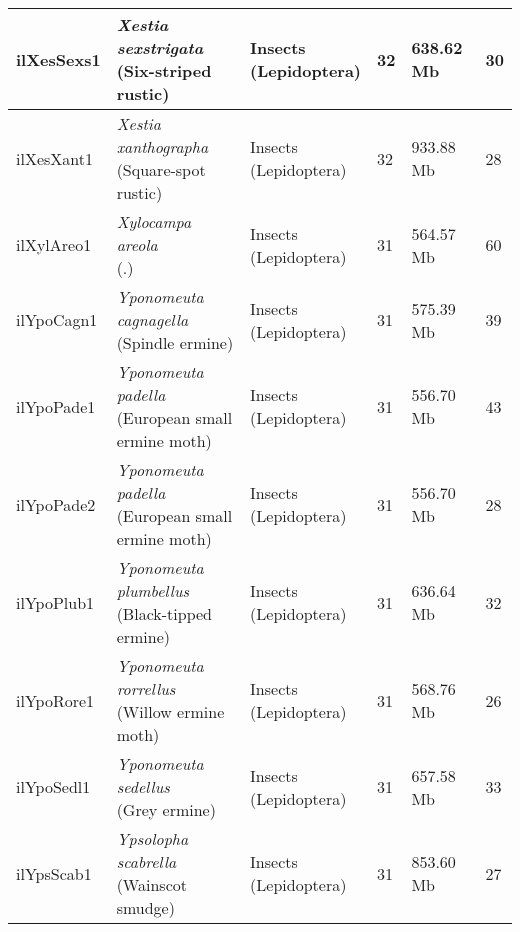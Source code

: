 \begin{centering}
\begin{longtable}{l|l|l|l|l|l}
ilXesSexs1 & \makecell[{l}]{\textit{Xestia sexstrigata} \\ (Six-striped rustic)} & \makecell[{l}]{Insects \\ (Lepidoptera)} & 32 & 638.62 Mb & 30  \\ \hline
ilXesXant1 & \makecell[{l}]{\textit{Xestia xanthographa} \\ (Square-spot rustic)} & \makecell[{l}]{Insects \\ (Lepidoptera)} & 32 & 933.88 Mb & 28  \\ \hline
ilXylAreo1 & \makecell[{l}]{\textit{Xylocampa areola} \\ (.)} & \makecell[{l}]{Insects \\ (Lepidoptera)} & 31 & 564.57 Mb & 60  \\ \hline
ilYpoCagn1 & \makecell[{l}]{\textit{Yponomeuta cagnagella} \\ (Spindle ermine)} & \makecell[{l}]{Insects \\ (Lepidoptera)} & 31 & 575.39 Mb & 39  \\ \hline
ilYpoPade1 & \makecell[{l}]{\textit{Yponomeuta padella} \\ (European small ermine moth)} & \makecell[{l}]{Insects \\ (Lepidoptera)} & 31 & 556.70 Mb & 43  \\ \hline
ilYpoPade2 & \makecell[{l}]{\textit{Yponomeuta padella} \\ (European small ermine moth)} & \makecell[{l}]{Insects \\ (Lepidoptera)} & 31 & 556.70 Mb & 28  \\ \hline
ilYpoPlub1 & \makecell[{l}]{\textit{Yponomeuta plumbellus} \\ (Black-tipped ermine)} & \makecell[{l}]{Insects \\ (Lepidoptera)} & 31 & 636.64 Mb & 32  \\ \hline
ilYpoRore1 & \makecell[{l}]{\textit{Yponomeuta rorrellus} \\ (Willow ermine moth)} & \makecell[{l}]{Insects \\ (Lepidoptera)} & 31 & 568.76 Mb & 26  \\ \hline
ilYpoSedl1 & \makecell[{l}]{\textit{Yponomeuta sedellus} \\ (Grey ermine)} & \makecell[{l}]{Insects \\ (Lepidoptera)} & 31 & 657.58 Mb & 33  \\ \hline
ilYpsScab1 & \makecell[{l}]{\textit{Ypsolopha scabrella} \\ (Wainscot smudge)} & \makecell[{l}]{Insects \\ (Lepidoptera)} & 31 & 853.60 Mb & 27  \\ \hline

\end{longtable}
\end{centering}
